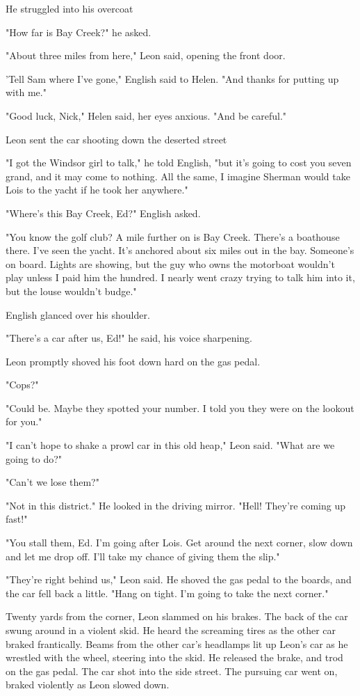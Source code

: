 \documentclass{novel}
\begin{document}
He struggled into his overcoat

"How far is Bay Creek?" he asked.

"About three miles from here," Leon said, opening the front door.

'Tell Sam where I've gone," English said to Helen. "And thanks for putting up with me."

"Good luck, Nick," Helen said, her eyes anxious. "And be careful."

Leon sent the car shooting down the deserted street

"I got the Windsor girl to talk," he told English, "but it's going to cost you seven grand, and it may come to nothing. All the same, I imagine Sherman would take Lois to the yacht if he took her anywhere."

"Where's this Bay Creek, Ed?" English asked.

"You know the golf club? A mile further on is Bay Creek. There's a boathouse there. I've seen the yacht. It's anchored about six miles out in the bay. Someone's on board. Lights are showing, but the guy who owns the motorboat wouldn't play unless I paid him the hundred. I nearly went crazy trying to talk him into it, but the louse wouldn't budge."

English glanced over his shoulder.

"There's a car after us, Ed!" he said, his voice sharpening.

Leon promptly shoved his foot down hard on the gas pedal.

"Cops?"

"Could be. Maybe they spotted your number. I told you they were on the lookout for you."

"I can't hope to shake a prowl car in this old heap," Leon said. "What are we going to do?"

"Can't we lose them?"

"Not in this district." He looked in the driving mirror. "Hell! They're coming up fast!"

"You stall them, Ed. I'm going after Lois. Get around the next corner, slow down and let me drop off. I'll take my chance of giving them the slip."

"They're right behind us," Leon said. He shoved the gas pedal to the boards, and the car fell back a little. "Hang on tight. I'm going to take the next corner."

Twenty yards from the corner, Leon slammed on his brakes. The back of the car swung around in a violent skid. He heard the screaming tires as the other car braked frantically. Beams from the other car's headlamps lit up Leon's car as he wrestled with the wheel, steering into the skid. He released the brake, and trod on the gas pedal. The car shot into the side street. The pursuing car went on, braked violently as Leon slowed down.
\end{document}
